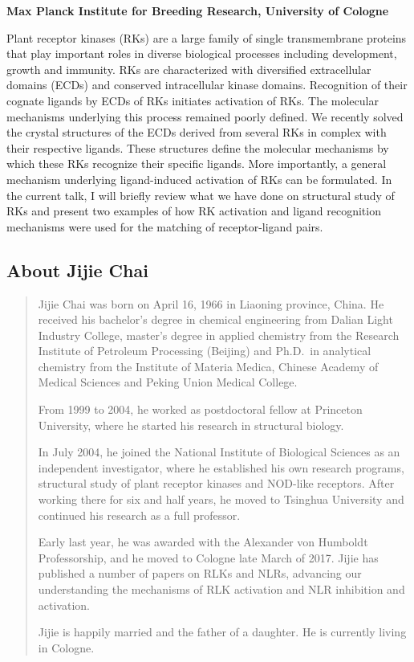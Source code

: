 \documentclass[12pt,]{book}
\theoremstyle{definition}
\theoremstyle{definition}
\theoremstyle{remark}
\begin{document}
\textbf{Max Planck Institute for Breeding Research, University of
Cologne}

Plant receptor kinases (RKs) are a large family of single transmembrane
proteins that play important roles in diverse biological processes
including development, growth and immunity. RKs are characterized with
diversified extracellular domains (ECDs) and conserved intracellular
kinase domains. Recognition of their cognate ligands by ECDs of RKs
initiates activation of RKs. The molecular mechanisms underlying this
process remained poorly defined. We recently solved the crystal
structures of the ECDs derived from several RKs in complex with their
respective ligands. These structures define the molecular mechanisms by
which these RKs recognize their specific ligands. More importantly, a
general mechanism underlying ligand-induced activation of RKs can be
formulated. In the current talk, I will briefly review what we have done
on structural study of RKs and present two examples of how RK activation
and ligand recognition mechanisms were used for the matching of
receptor-ligand pairs.

\subsection*{About Jijie Chai}\label{about-jijie-chai}

\begin{quote}
Jijie Chai was born on April 16, 1966 in Liaoning province, China. He
received his bachelor's degree in chemical engineering from Dalian Light
Industry College, master's degree in applied chemistry from the Research
Institute of Petroleum Processing (Beijing) and Ph.D.~in analytical
chemistry from the Institute of Materia Medica, Chinese Academy of
Medical Sciences and Peking Union Medical College.

From 1999 to 2004, he worked as postdoctoral fellow at Princeton
University, where he started his research in structural biology.

In July 2004, he joined the National Institute of Biological Sciences as
an independent investigator, where he established his own research
programs, structural study of plant receptor kinases and NOD-like
receptors. After working there for six and half years, he moved to
Tsinghua University and continued his research as a full professor.

Early last year, he was awarded with the Alexander von Humboldt
Professorship, and he moved to Cologne late March of 2017. Jijie has
published a number of papers on RLKs and NLRs, advancing our
understanding the mechanisms of RLK activation and NLR inhibition and
activation.

Jijie is happily married and the father of a daughter. He is currently
living in Cologne.
\end{quote}
\end{document}
